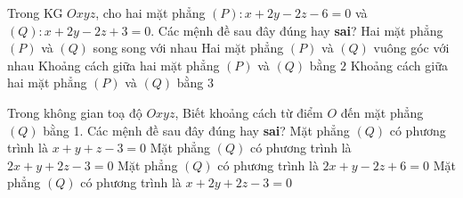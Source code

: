 \begin{ex}%
	Trong KG $Oxyz$, cho hai mặt phẳng $(P)\colon x+2y-2z-6=0$ và $(Q)\colon x+2y-2z+3=0$. Các mệnh đề sau đây đúng hay \textbf{sai}?
\choiceTF
{\True Hai mặt phẳng $(P)$ và $(Q)$ song song với nhau}
{Hai mặt phẳng $(P)$ và $(Q)$ vuông góc với nhau}
{Khoảng cách giữa hai mặt phẳng $(P)$ và $(Q)$ bằng $2$}
{\True Khoảng cách giữa hai mặt phẳng $(P)$ và $(Q)$ bằng $3$}
\end{ex}

\begin{ex}%
	Trong không gian toạ độ $Oxyz$, Biết khoảng cách từ điểm $O$ đến mặt phẳng $(Q)$ bằng 1. Các mệnh đề sau đây đúng hay \textbf{sai}?
\choiceTF
{Mặt phẳng $(Q)$ có phương trình là $x + y + z-3 = 0$}
{\True Mặt phẳng $(Q)$ có phương trình là $2x + y + 2z-3 = 0$}
{Mặt phẳng $(Q)$ có phương trình là $2x + y- 2z + 6 = 0$}
{\True Mặt phẳng $(Q)$ có phương trình là $x + 2y + 2z-3= 0$}
\end{ex}


